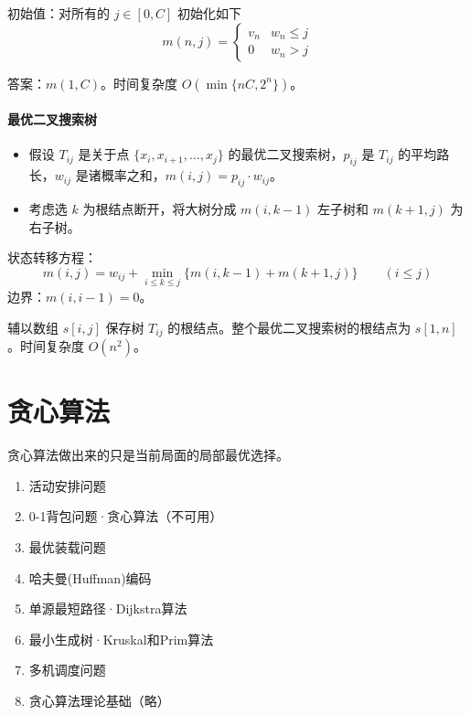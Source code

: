 \documentclass[UTF8]{ctexart}
\newcommand\Emph[1]{\textcolor{cyan!80!black}{#1}}
\begin{document}
初始值：对所有的 $j\in [0,C]$ 初始化如下
\begin{equation*}
    m(n,j) = \begin{cases}  v_n & w_n\leqslant j \\ 0 & w_n > j \end{cases}
\end{equation*}

答案：$m(1,C)$。\Emph{时间复杂度 $O(\min\{nC,2^n\})$。}

\paragraph{最优二叉搜索树} 

\begin{itemize}
  \item 假设 $T_{ij}$ 是关于点 $\{x_i,x_{i+1},\dots,x_j\}$ 的最优二叉搜索树，$p_{ij}$ 是 $T_{ij}$ 的平均路长，$w_{ij}$ 是诸概率之和，$m(i,j) = p_{ij}\cdot w_{ij}$。
  \item 考虑选 $k$ 为根结点断开，将大树分成 $m(i,k-1)$ 左子树和 $m(k+1,j)$ 为右子树。
\end{itemize}
状态转移方程：
\begin{equation*}
  m(i,j) = w_{ij} + \min\limits_{i\leqslant k\leqslant j} \{m(i,k-1) + m(k+1,j)\}\qquad (i\leqslant j)
\end{equation*}
边界：$m(i,i-1)=0$。

辅以数组 $s[i,j]$ 保存树 $T_{ij}$ 的根结点。整个最优二叉搜索树的根结点为 $s[1,n]$。\Emph{时间复杂度 $O(n^2)$。}

\section{贪心算法}
\begin{summary}
贪心算法做出来的只是当前局面的局部最优选择。
\begin{enumerate}[itemsep=0pt,parsep=0pt]
  \item \Emph{活动安排问题}
  \item 0-1背包问题·贪心算法（不可用）
  \item \Emph{最优装载问题}
  \item 哈夫曼(Huffman)编码
  \item 单源最短路径·Dijkstra算法
  \item 最小生成树·Kruskal和Prim算法
  \item 多机调度问题
  \item 贪心算法理论基础（略）
\end{enumerate}
\end{summary}
\end{document}

